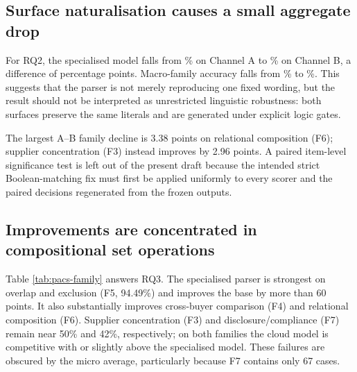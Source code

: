 \subsection{Surface naturalisation causes a small aggregate drop}

For RQ2, the specialised model falls from \PacsOursA\% on Channel A to \PacsOursB\% on Channel
B, a difference of \PacsSurfaceDrop{} percentage points.  Macro-family accuracy falls from
\PacsMacroA\% to \PacsMacroB\%.  This suggests that the parser is not merely reproducing one
fixed wording, but the result should not be interpreted as unrestricted linguistic robustness:
both surfaces preserve the same literals and are generated under explicit logic gates.

The largest A--B family decline is 3.38 points on relational composition (F6); supplier
concentration (F3) instead improves by 2.96 points.  A paired item-level significance test is
left out of the present draft because the intended strict Boolean-matching fix must first be
applied uniformly to every scorer and the paired decisions regenerated from the frozen outputs.

\subsection{Improvements are concentrated in compositional set operations}

Table \ref{tab:pacs-family} answers RQ3.  The specialised parser is strongest on overlap and
exclusion (F5, 94.49\%) and improves the base by more than 60 points.  It also substantially
improves cross-buyer comparison (F4) and relational composition (F6).  Supplier concentration
(F3) and disclosure/compliance (F7) remain near 50\% and 42\%, respectively; on both families the
cloud model is competitive with or slightly above the specialised model.  These failures are
obscured by the micro average, particularly because F7 contains only 67 cases.

